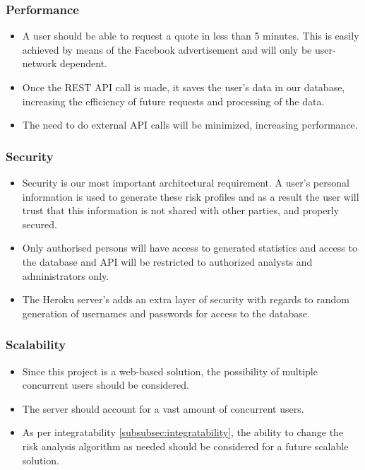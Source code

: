 \documentclass{article}
\begin{document}
		\subsubsection{Performance}
		\begin{itemize}
			\item A user should be able to request a quote in less than 5 minutes. This is easily achieved by means of the Facebook advertisement and will only be user-network dependent.
			\item Once the REST API call is made, it saves the user's data in our database, increasing the efficiency of future requests and processing of the data.
			\item The need to do external API calls will be minimized, increasing performance.
		\end{itemize}
		 
		\subsubsection{Security}\label{subsubsec:security}
		\begin{itemize}
			\item Security is our most important architectural requirement. A user's personal information is used to generate these risk profiles and as a result the user will trust that this information is not shared with other parties, and properly secured.
			\item Only authorised persons will have access to generated statistics and access to the database and API will be restricted to authorized analysts and administrators only.
			\item The Heroku server's adds an extra layer of security with regards to random generation of usernames and passwords for access to the database.
		\end{itemize}
		\subsubsection{Scalability}
		\begin{itemize}
			\item Since this project is a web-based solution, the possibility of multiple concurrent users should be considered.
			\item The server should account for a vast amount of concurrent users.
			\item As per integratability \ref{subsubsec:integratability}, the ability to change the risk analysis algorithm as needed should be considered for a future scalable solution.
		\end{itemize}
\end{document}
